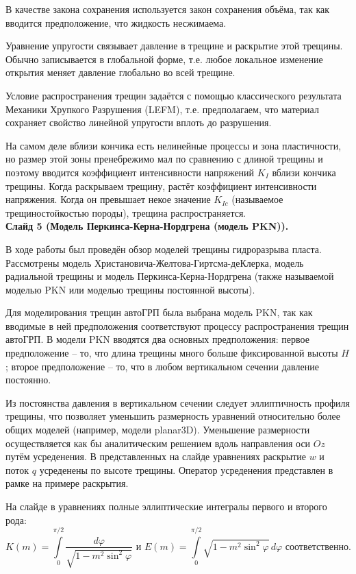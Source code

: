 \documentclass[a4paper, 12pt]{article}
\begin{document}
В качестве закона сохранения используется закон сохранения объёма, так как вводится предположение, что жидкость несжимаема.

Уравнение упругости связывает давление в трещине и раскрытие этой трещины.
Обычно записывается в глобальной форме, т.е. любое локальное изменение открытия меняет давление глобально во всей трещине.

Условие распространения трещин задаётся с помощью классического результата Механики Хрупкого Разрушения (LEFM), т.е. предполагаем, что материал сохраняет свойство линейной упругости вплоть до разрушения.

На самом деле вблизи кончика есть нелинейные процессы и зона пластичности, но размер этой зоны пренебрежимо мал по сравнению с длиной трещины и поэтому вводится коэффициент интенсивности напряжений $K_I$ вблизи кончика трещины.
Когда раскрываем трещину, растёт коэффициент интенсивности напряжения.
Когда он превышает некое значение $K_{Ic}$ (называемое трещиностойкостью породы), трещина распространяется.
\\

\textbf{Слайд 5 (Модель Перкинса-Керна-Нордгрена (модель PKN)).}

В ходе работы был проведён обзор моделей трещины гидроразрыва пласта.
Рассмотрены модель Христановича-Желтова-Гиртсма-деКлерка, модель радиальной трещины и модель Перкинса-Керна-Нордгрена (также называемой моделью PKN или моделью трещины постоянной высоты).

Для моделирования трещин автоГРП была выбрана модель PKN, так как вводимые в ней предположения соответствуют процессу распространения трещин автоГРП.
В модели PKN вводятся два основных предположения: первое предположение -- то, что длина трещины много больше фиксированной высоты $H$; второе предположение -- то, что в любом вертикальном сечении давление постоянно.

Из постоянства давления в вертикальном сечении следует эллиптичность профиля трещины, что позволяет уменьшить размерность уравнений относительно более общих моделей (например, модели planar3D).
Уменьшение размерности осуществляется как бы аналитическим решением вдоль направления оси $Oz$ путём усреденения.
В представленных на слайде уравнениях раскрытие $w$ и поток $q$ усреденены по высоте трещины.
Оператор усреденения представлен в рамке на примере раскрытия.

На слайде в уравнениях полные эллиптические интегралы первого и второго рода:
$$K(m)=\int\limits_{0}^{\pi/2}{\frac{d\varphi}{\sqrt{1-m^2\sin^2{\!\varphi}}}}\text{ и } E(m)=\int\limits_{0}^{\pi/2}{\sqrt{1-m^2\sin^2{\!\varphi}}\,d\varphi}\text{ соответственно.}$$
\\
\end{document}
